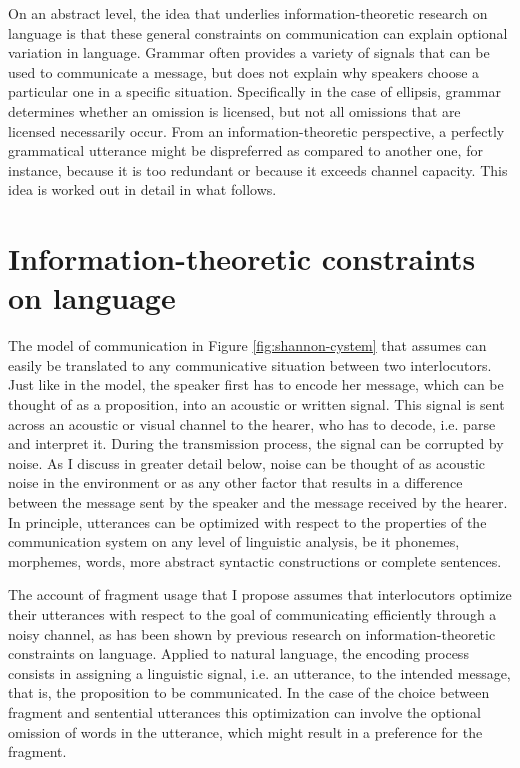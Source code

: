 On an abstract level, the idea that underlies information-theoretic research on language is that these general constraints on communication can explain optional variation in language. Grammar often provides a variety of signals that can be used to communicate a message, but does not explain why speakers choose a particular one in a specific situation. Specifically in the case of ellipsis, grammar determines whether an omission is licensed, but not all omissions that are licensed necessarily occur. From an information-theoretic perspective, a perfectly grammatical utterance might be dispreferred as compared to another one, for instance, because it is too redundant or because it exceeds channel capacity. This idea is worked out in detail in what follows.

\section{Information-theoretic constraints on language}
\label{sec:infotheory-language}

The model of communication in Figure \ref{fig:shannon-cystem} that \citet{shannon1948} assumes can easily be translated to any communicative situation between two interlocutors. Just like in the model, the speaker first has to  encode her message, which can be thought of as a proposition, into an acoustic or written signal. This signal is sent across an acoustic or visual channel to the hearer, who has to decode, i.e. parse and interpret it. During the transmission process, the signal can be corrupted by noise. As I discuss in greater detail below, noise can be thought of as acoustic noise in the environment or as any other factor that results in a difference between the message sent by the speaker and the message received by the hearer. In principle, utterances can be optimized with respect to the properties of the communication system on any level of linguistic analysis, be it phonemes, morphemes, words, more abstract syntactic constructions or complete sentences.

The account of fragment usage that I propose assumes that interlocutors optimize their utterances with respect to the goal of communicating efficiently through a noisy channel, as has been shown by previous research on information-theoretic constraints on language. Applied to natural language, the encoding process consists in assigning a linguistic signal, i.e. an utterance, to the intended message, that is, the proposition to be communicated. In the case of the choice between fragment and sentential utterances this optimization can involve the optional omission of words in the utterance, which might result in a preference for the fragment.

